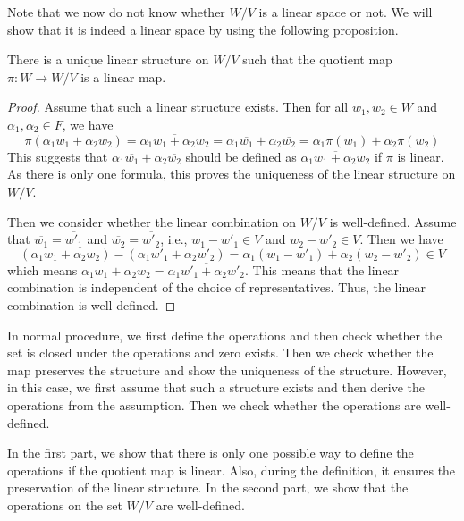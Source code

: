 \documentclass[
	11pt, %
	fleqn, %
	a4paper, %
]{LegrandOrangeBook}
\renewcommand{\bar}[1]{\overline{#1}} %
\newcommand{\quotient}[2]{#1\! / #2} %
\begin{document}
Note that we now do not know whether $\quotient{W}{V}$ is a linear space or not. We will show that it is indeed a linear space by using the following proposition.

\begin{proposition}
    There is a unique linear structure on $\quotient{W}{V}$ such that the quotient map $\pi : W \to \quotient{W}{V}$ is a linear map.
\end{proposition}

\begin{proof}
    Assume that such a linear structure exists. Then for all $w_1, w_2 \in W$ and $\alpha_1, \alpha_2 \in F$, we have
    \[
        \pi(\alpha_1 w_1 + \alpha_2 w_2) = \bar{\alpha_1 w_1 + \alpha_2 w_2} = \alpha_1 \bar{w_1} + \alpha_2 \bar{w_2} = \alpha_1 \pi(w_1) + \alpha_2 \pi(w_2)
    \]
    This suggests that $\alpha_1 \bar{w_1} + \alpha_2 \bar{w_2}$ should be defined as $\bar{\alpha_1 w_1 + \alpha_2 w_2}$ if $\pi$ is linear. As there is only one formula, this proves the uniqueness of the linear structure on $\quotient{W}{V}$.

    Then we consider whether the linear combination on $\quotient{W}{V}$ is well-defined. Assume that $\bar{w_1} = \bar{w'_1}$ and $\bar{w_2} = \bar{w'_2}$, i.e., $w_1 - w'_1 \in V$ and $w_2 - w'_2 \in V$. Then we have
    \[
        (\alpha_1 w_1 + \alpha_2 w_2) - (\alpha_1 w'_1 + \alpha_2 w'_2) = \alpha_1 (w_1 - w'_1) + \alpha_2 (w_2 - w'_2) \in V
    \]
    which means $\bar{\alpha_1 w_1 + \alpha_2 w_2} = \bar{\alpha_1 w'_1 + \alpha_2 w'_2}$. This means that the linear combination is independent of the choice of representatives. Thus, the linear combination is well-defined.
\end{proof}

In normal procedure, we first define the operations and then check whether the set is closed under the operations and zero exists. Then we check whether the map preserves the structure and show the uniqueness of the structure. However, in this case, we first assume that such a structure exists and then derive the operations from the assumption. Then we check whether the operations are well-defined.

In the first part, we show that there is only one possible way to define the operations if the quotient map is linear. Also, during the definition, it ensures the preservation of the linear structure. In the second part, we show that the operations on the set $\quotient{W}{V}$ are well-defined.

\newpage
\end{document}
